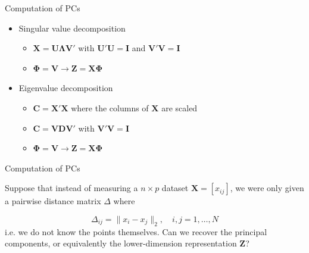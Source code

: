 \documentclass[14pt]{beamer}
\begin{document}

\begin{frame}{Computation of PCs}

\begin{itemize}

\item Singular value decomposition

\begin{itemize}
\item $\bm{X} = \bm{U}\bm{\Lambda}\bm{V}'$ with $\bm{U}'\bm{U}=\bm{I}$ and $\bm{V}'\bm{V}=\bm{I}$
\item $\bm{\Phi} = \bm{V} \rightarrow \bm{Z} = \bm{X}\bm{\Phi}$
\end{itemize}
	
\item Eigenvalue decomposition

\begin{itemize}
\item $\bm{C} = \bm{X'X}$ where the columns of $\bm{X}$ are scaled
\item $\bm{C}=\bm{V}\bm{D}\bm{V}'$ with $\bm{V}'\bm{V}=\bm{I}$
\item $\bm{\Phi} = \bm{V} \rightarrow \bm{Z} = \bm{X}\bm{\Phi}$
\end{itemize}

\end{itemize}


\end{frame}

\begin{frame}{Computation of PCs}

Suppose that instead of measuring a $n \times p$ dataset $\bm{X} = [x_{ij}]$, we were only given a pairwise distance matrix $\Delta$ where

$$ \Delta_{ij} = \lVert x_i - x_j \rVert_2, \quad i, j = 1, \dots, N$$
i.e. we do not know  the points themselves. Can we recover the principal components, or equivalently the lower-dimension representation $\bm{Z}$?

\end{frame}
\end{document}
